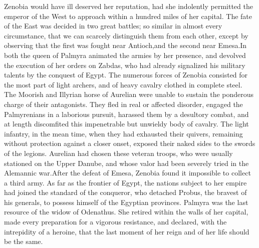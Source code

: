 Zenobia would have ill deserved her reputation, had she
indolently permitted the emperor of the West to approach within a
hundred miles of her capital. The fate of the East was decided in
two great battles; so similar in almost every circumstance, that
we can scarcely distinguish them from each other, except by
observing that the first was fought near Antioch,\footnotemark[65] and the
second near Emesa.\footnotemark[66] In both the queen of Palmyra animated the
armies by her presence, and devolved the execution of her orders
on Zabdas, who had already signalized his military talents by the
conquest of Egypt. The numerous forces of Zenobia consisted for
the most part of light archers, and of heavy cavalry clothed in
complete steel. The Moorish and Illyrian horse of Aurelian were
unable to sustain the ponderous charge of their antagonists. They
fled in real or affected disorder, engaged the Palmyrenians in a
laborious pursuit, harassed them by a desultory combat, and at
length discomfited this impenetrable but unwieldy body of
cavalry. The light infantry, in the mean time, when they had
exhausted their quivers, remaining without protection against a
closer onset, exposed their naked sides to the swords of the
legions. Aurelian had chosen these veteran troops, who were
usually stationed on the Upper Danube, and whose valor had been
severely tried in the Alemannic war.\footnotemark[67] After the defeat of
Emesa, Zenobia found it impossible to collect a third army. As
far as the frontier of Egypt, the nations subject to her empire
had joined the standard of the conqueror, who detached Probus,
the bravest of his generals, to possess himself of the Egyptian
provinces. Palmyra was the last resource of the widow of
Odenathus. She retired within the walls of her capital, made
every preparation for a vigorous resistance, and declared, with
the intrepidity of a heroine, that the last moment of her reign
and of her life should be the same.




